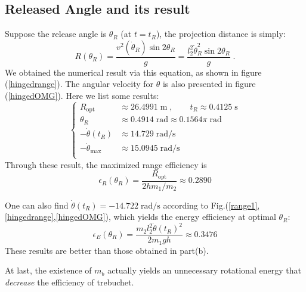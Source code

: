 \documentclass[%
reprint,
amsmath,amssymb,
aps,
]{revtex4-1}
\begin{document}
	\subsection{Released Angle and its result}
	Suppose the release angle is $\theta_R$ (at $t=t_R$), the projection distance is simply:
	\begin{equation}
	R(\theta_R)
	=
	\frac{v^2(\dot{\theta}_R) \sin 2\theta_R}{g}
	=
	\frac{l_2^2\dot{\theta}_R^2 \sin 2\theta_R}{g}\;.
	\end{equation}
	We obtained the numerical result via this equation, as shown in figure (\ref{hingedrange}). 
	The angular velocity for $\theta$ is also presented in figure (\ref{hingedOMG}). Here we list some results:
	\begin{equation}
	\left\{
	\begin{aligned}
	R_{\mathrm{opt}} &\approx 26.4991 \;\mathrm{m}\;,\qquad
	t_R \approx 0.4125\;\mathrm{s}\\
	\theta_R &\approx 0.4914\;\mathrm{rad}
	\approx 0.1564\pi\;\mathrm{rad}\\
	-\dot{\theta}(t_R) &\approx 14.729\;\mathrm{rad/s}\\ 
	-\dot{\theta}_{\mathrm{max}} &\approx 15.0945\;\mathrm{rad/s}\\ 
	\end{aligned}\right.
	\end{equation}
	Through these result, the maximized range efficiency is
	\begin{equation}
	\epsilon_R(\theta_R)
	=
	\frac{R_{\mathrm{opt}}}{2h m_1  /m_2}
	\approx0.2890
	\end{equation}
	
	One can also find $\dot{\theta}(t_R) = -14.722\;\mathrm{rad/s}$ according to Fig.(\ref{range1},\ref{hingedrange},\ref{hingedOMG}), which yields the energy efficiency at optimal $\theta_R$:
	\begin{equation}
	\epsilon_{E}(\theta_R)=\frac{m_2l_2^2
		\dot{\theta}(t_R)^2}{2m_1g h}
	\approx 0.3476%
	\end{equation}
	These results are better than those obtained in part(b).
	
	At last, the existence of $m_b$ actually yields an unnecessary rotational energy that \emph{decrease} the efficiency of trebuchet.
	\newline\newpage
	\newpage
\end{document}
